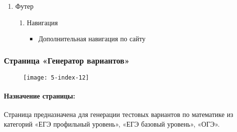 \begin{enumerate}
	\item Футер
	\begin{enumerate}
		\item Навигация
		\begin{itemize}
			\item Дополнительная навигация по сайту
		\end{itemize}
	\end{enumerate}
\end{enumerate}


\subsubsection{Страница «Генератор вариантов»}
\begin{figure}[H]
\texttt{[image: 5-index-12]}
\end{figure}
\paragraph{Назначение страницы:} Страница предназначена для генерации тестовых вариантов по математике из категорий «ЕГЭ профильный уровень», «ЕГЭ базовый уровень», «ОГЭ».


